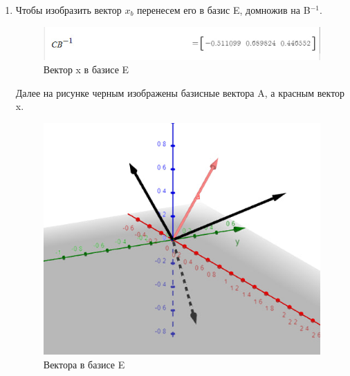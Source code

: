 \begin{enumerate}
    \item
        Чтобы изобразить вектор $x_b$ перенесем его в базис E, домножив на B$^{-1}$.\\
        \begin{figure}[H]
            \centering
            \includegraphics[width=0.6\linewidth]{images/2_x}
            \caption{Вектор x в базисе E}
        \end{figure}
        Далее на рисунке черным изображены базисные вектора A, а красным вектор x.\\
        \begin{figure}[H]
            \centering
            \includegraphics[width=0.6\linewidth]{images/2_E_graph}
            \caption{Вектора в базисе E}
        \end{figure}
\end{enumerate}


\clearpage
